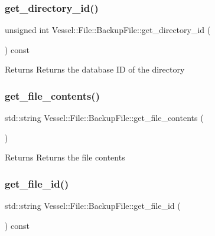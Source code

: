 \subsubsection{\texorpdfstring{get\+\_\+directory\+\_\+id()}{get\_directory\_id()}}
{\footnotesize\ttfamily unsigned int Vessel\+::\+File\+::\+Backup\+File\+::get\+\_\+directory\+\_\+id (\begin{DoxyParamCaption}{ }\end{DoxyParamCaption}) const}

\begin{DoxyReturn}{Returns}
Returns the database ID of the directory 
\end{DoxyReturn}
\mbox{\label{class_vessel_1_1_file_1_1_backup_file_ac174329c938bd09c196e63a52540e33b}} 
\subsubsection{\texorpdfstring{get\+\_\+file\+\_\+contents()}{get\_file\_contents()}}
{\footnotesize\ttfamily std\+::string Vessel\+::\+File\+::\+Backup\+File\+::get\+\_\+file\+\_\+contents (\begin{DoxyParamCaption}{ }\end{DoxyParamCaption})}

\begin{DoxyReturn}{Returns}
Returns the file contents 
\end{DoxyReturn}
\mbox{\label{class_vessel_1_1_file_1_1_backup_file_aceb6698bc333c64694303919eece6628}} 
\subsubsection{\texorpdfstring{get\+\_\+file\+\_\+id()}{get\_file\_id()}}
{\footnotesize\ttfamily std\+::string Vessel\+::\+File\+::\+Backup\+File\+::get\+\_\+file\+\_\+id (\begin{DoxyParamCaption}{ }\end{DoxyParamCaption}) const}

